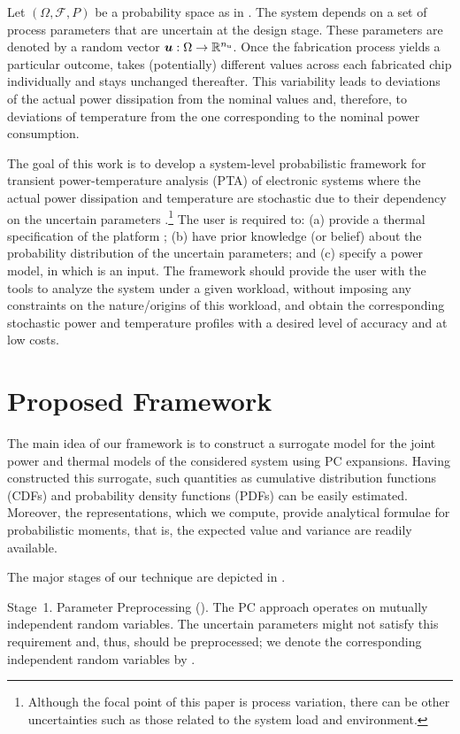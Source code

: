 Let $(\Omega, \mathcal{F}, P)$ be a probability space as in
. The system depends on a set of process parameters
that are uncertain at the design stage. These parameters are denoted by a random
vector $\boldsymbol{u}: \Omega \to \mathbb{R}^{n_\mathrm{u}}$. Once the fabrication process yields a
particular outcome, \vu takes (potentially) different values across each
fabricated chip individually and stays unchanged thereafter. This variability
leads to deviations of the actual power dissipation from the nominal values and,
therefore, to deviations of temperature from the one corresponding to the
nominal power consumption.

The goal of this work is to develop a system-level probabilistic framework for
transient power-temperature analysis (PTA) of electronic systems where the
actual power dissipation and temperature are stochastic due to their dependency
on the uncertain parameters \vu.\footnote{Although the focal point of this paper
is process variation, there can be other uncertainties such as those related to
the system load and environment.} The user is required to: (a) provide a thermal
specification of the platform \spec; (b) have prior knowledge (or belief) about
the probability distribution of the uncertain parameters; and (c) specify a
power model, in which \vu is an input. The framework should provide the user
with the tools to analyze the system under a given workload, without imposing
any constraints on the nature/origins of this workload, and obtain the
corresponding stochastic power \mp and temperature \mq profiles with a desired
level of accuracy and at low costs.

\section{Proposed Framework}

The main idea of our framework is to construct a surrogate model for the joint
power and thermal models of the considered system using PC expansions. Having
constructed this surrogate, such quantities as cumulative distribution functions
(CDFs) and probability density functions (PDFs) can be easily estimated.
Moreover, the representations, which we compute, provide analytical formulae for
probabilistic moments, that is, the expected value and variance are readily
available.

The major stages of our technique are depicted in .

Stage~1. Parameter Preprocessing (). The PC approach
operates on mutually independent random variables. The uncertain parameters \vu
might not satisfy this requirement and, thus, should be preprocessed; we denote
the corresponding independent random variables by \vz.

